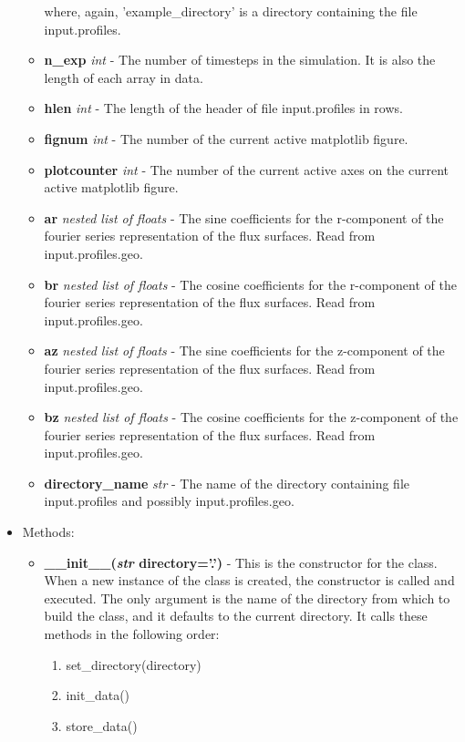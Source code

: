 \documentclass{article}
\begin{document}
\begin{itemize}
\begin{itemize}
\fontfamily{\rmdefault}\selectfont
\noindent where, again, 'example\_directory' is a directory containing the file input.profiles.
\item \textbf{n\_exp} \emph{int} - The number of timesteps in the simulation.  It is also the length of each array in data.
\item \textbf{hlen} \emph{int} - The length of the header of file input.profiles in rows.
\item \textbf{fignum} \emph{int} - The number of the current active matplotlib figure.
\item \textbf{plotcounter} \emph{int} - The number of the current active axes on the current active matplotlib figure.
\item \textbf{ar} \emph{nested list of floats} - The sine coefficients for the r-component of the fourier series representation of the flux surfaces.  Read from input.profiles.geo.
\item \textbf{br} \emph{nested list of floats} - The cosine coefficients for the r-component of the fourier series representation of the flux surfaces.  Read from input.profiles.geo.
\item \textbf{az} \emph{nested list of floats} - The sine coefficients for the z-component of the fourier series representation of the flux surfaces.  Read from input.profiles.geo.
\item \textbf{bz} \emph{nested list of floats} - The cosine coefficients for the z-component of the fourier series representation of the flux surfaces.  Read from input.profiles.geo.
\item \textbf{directory\_name} \emph{str} - The name of the directory containing file input.profiles and possibly input.profiles.geo.
\end{itemize}
\item Methods:
\begin{itemize}
\item \textbf{\_\_init\_\_(\emph{str} directory='.')} - This is the constructor for the class.  When a new instance of the class is created, the constructor is called and executed.  The only argument is the name of the directory from which to build the class, and it defaults to the current directory.  It calls these methods in the following order:
\begin{enumerate}
\item set\_directory(directory)
\item init\_data()
\item store\_data()
\end{enumerate}

\end{itemize}
\end{itemize}
\end{document}
